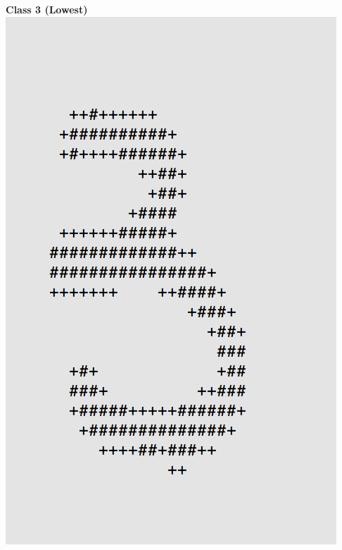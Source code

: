 \documentclass[11pt]{article}
\begin{document}
\begin{center}
\begin{multicols}{2}
\textbf{Class 3 (Lowest)}\\
\includegraphics[scale=0.4]{part1/1/low_3.png}
\end{multicols}
\end{center}
\end{document}
